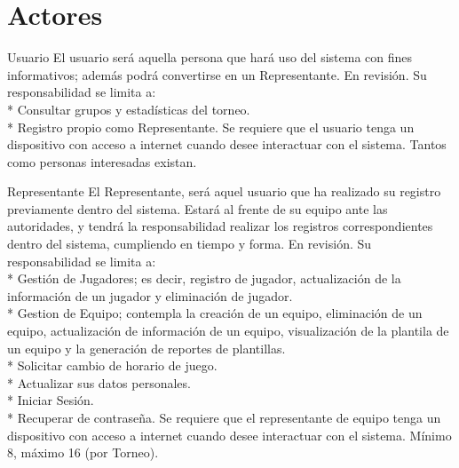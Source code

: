 \section{Actores}
\dotfill
\newline
\begin{Actor}{Usuario} 
	\BRitem[Descripción:] El usuario será aquella persona que hará uso del sistema con fines informativos; además podrá convertirse en un Representante.
	\BRitem[Estatus:] En revisión.
	\BRitem[Responsabilidades:] Su responsabilidad se limita a: \\
	\** Consultar grupos y estadísticas del torneo. \\
	\** Registro propio como Representante.
	\BRitem[Perfil:] Se requiere que el usuario tenga un dispositivo con acceso a internet cuando desee interactuar con el sistema.
	\BRitem[Cantidad:] Tantos como personas interesadas existan.
\end{Actor}
\dotfill
\newline
\begin{Actor}{Representante} 
	\BRitem[Descripción:] El Representante, será aquel usuario que ha realizado su registro previamente dentro del sistema. Estará al frente de su equipo ante las autoridades, y tendrá la responsabilidad realizar los registros correspondientes dentro del sistema, cumpliendo en tiempo y forma.
	\BRitem[Estatus:] En revisión.
	\BRitem[Responsabilidades:] Su responsabilidad se limita a:\\
	\** Gestión de Jugadores; es decir, registro de jugador, actualización de la información de un jugador y eliminación de jugador.\\
	\** Gestion de Equipo; contempla la creación de un equipo, eliminación de un equipo, actualización de información de un equipo, visualización de la plantila de un equipo y la generación de reportes de plantillas.\\
	\** Solicitar cambio de horario de juego.\\
	\** Actualizar sus datos personales. \\
	\** Iniciar Sesión.\\
	\** Recuperar de contraseña.
	\BRitem[Perfil:] Se requiere que el representante de equipo tenga un dispositivo con acceso a internet cuando desee interactuar con el sistema.
	\BRitem[Cantidad:] Mínimo 8, máximo 16 (por Torneo).
\end{Actor}
\dotfill
\newline
